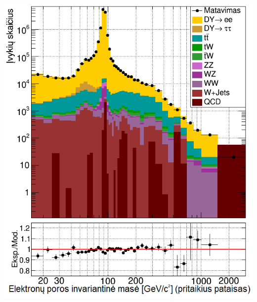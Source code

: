 \documentclass[xcolor=dvipsnames]{beamer}
\begin{document}
\begin{frame}
\begin{minipage}{0.49\textwidth}
		\includegraphics[width=\linewidth]{eeMassAfter_SMALL.png}
	\end{minipage}
\end{frame}
\end{document}
